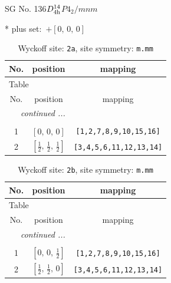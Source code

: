 \documentclass[fleqn,8pt]{jsarticle}
\begin{document}
\setcounter{MaxMatrixCols}{32}

\renewcommand{\tablename}{Table~}
\renewcommand{\figurename}{Figure~}
\begin{center}
\LARGE
SG No. 136\quad$D_{\rm 4h}^{14}$\quad$P4_2/mnm$\quad[ tetragonal ]
\end{center}
* plus set:\,\,\,$+\left[ 0,\, 0,\, 0 \right]$
\renewcommand{\arraystretch}{1.2}
\begin{longtable}{ccc}
\caption{Wyckoff site: {\tt 2a}, site symmetry: {\tt m.mm}}
 \\
 \hline \hline
No. & position & mapping \\ \hline \endfirsthead

\multicolumn{2}{l}{\tablename\ \thetable{}} \\
 \hline \hline
No. & position & mapping \\ \hline \endhead

 \hline \hline
\multicolumn{2}{r}{\footnotesize\it continued ...} \\ \endfoot

 \hline \hline
\multicolumn{2}{r}{} \\ \endlastfoot

1 & $\left[ 0,\, 0,\, 0 \right]$ & {\tt [1,2,7,8,9,10,15,16]} \\ \hline
2 & $\left[ \frac{1}{2},\, \frac{1}{2},\, \frac{1}{2} \right]$ & {\tt [3,4,5,6,11,12,13,14]} \\
\end{longtable}
\renewcommand{\arraystretch}{1.2}
\begin{longtable}{ccc}
\caption{Wyckoff site: {\tt 2b}, site symmetry: {\tt m.mm}}
 \\
 \hline \hline
No. & position & mapping \\ \hline \endfirsthead

\multicolumn{2}{l}{\tablename\ \thetable{}} \\
 \hline \hline
No. & position & mapping \\ \hline \endhead

 \hline \hline
\multicolumn{2}{r}{\footnotesize\it continued ...} \\ \endfoot

 \hline \hline
\multicolumn{2}{r}{} \\ \endlastfoot

1 & $\left[ 0,\, 0,\, \frac{1}{2} \right]$ & {\tt [1,2,7,8,9,10,15,16]} \\ \hline
2 & $\left[ \frac{1}{2},\, \frac{1}{2},\, 0 \right]$ & {\tt [3,4,5,6,11,12,13,14]} \\
\end{longtable}
\end{document}
